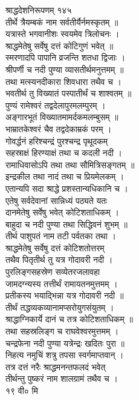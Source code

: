 \documentclass[11pt, openany]{book}
\begin{document}
{{{{{{{{{{{{{{{{{{{{{{{{{{{{{{{{{{{{{{{{{{{{{{{{{{{{{{{{{{{{{{{{{{{{{{{{{{{{{{{{{ }{ श्राद्धदेशनिरूपणम् १४५}{\\
तीर्थे त्रैयम्बकं नाम सर्वतीर्यैर्नमस्कृतम् ॥\\
यत्रास्ते भगवानीशः स्वयमेव त्रिलोचनः ।\\
श्राद्धमेतेषु सर्वेषु दत्तं कोटिगुणं भवेत् ॥\\
स्मरणादपि पापानि व्रजन्ति शतधा द्विजाः ।\\
श्रीपर्णी च नदी पुण्या व्यासतीर्थमनुत्तमम् ॥\\
तथा मत्स्यनदीकारा शिवधारा तथैव च ।\\
भवतीर्थ तु विख्यातं पस्पातीर्थं च शाश्वतम् ॥\\
पुण्यं रामेश्वरं तद्वदेलापुरमलम्पुरम् ।\\
अङ्गारभूतं विख्यातमामर्दकमलम्बुसम् ॥\\
भाम्रातकेश्वरं चैव तद्वदेकाम्रकं परम् ।\\
गोवर्द्धनं हरिश्चन्द्रं पुरश्चन्द्र पृथूदकम् \textbar{}\textbar{}\\
सहस्राक्षं हिरण्याक्षं तथा च कदली नदी ।\\
रामाधिवासोऽपि तथा तथा सौमित्रिसङ्गतम् ॥\\
इन्द्रकील तथा नादं तथा च प्रियमेलकम् ।\\
एतान्यपि सदा श्राद्धे प्रशस्तान्यधिकानि च ।\\
एतेषु सर्वदेवानां सान्निध्यं पठ्यते यतः \textbar{}\textbar{}\\
दानमेतेषु सर्वेषु भवेत् कोटिशताधिकम् ।\\
बाहुदा च नदी पुण्या तथा सिद्धिवनं शुभम् ॥\\
तीर्थ पाशुपतं नाम तटी पर्वतका तथा ।\\
श्राद्धमेतेषु सर्वेषु दत्तं कोटिशतोत्तरम् \textbar{}\textbar{}\\
तथैव पितृतीर्थ तु यत्र गोदावरी नदी ।\\
पुरलिङ्गसहस्रेण सव्येतरजलावहा \textbar{}\textbar{}\\
जामदग्न्यस्य तत्तीर्थं रामायतनमुत्तमम् ।\\
प्रतीकस्य भयाद्भिन्ना यत्र गोदावरी नदी ॥\\
तीर्थं तद्धव्यकव्यानामप्सरोयुगसंयुतम् ।\\
श्राद्धाग्निकार्ये दानं च तत्र कोटिशताधिकम् ॥\\
तथा सहस्रलिङ्ग च राघवेश्वरमुत्तमम् ।\\
चन्द्रफेना नदी पुण्या यत्रेन्द्रः खदितः पुरा ॥\\
निहत्य नमुचिं शत्रु तपसा स्वर्गमाप्तवान् ।\\
तत्र दत्तं नरैः श्राद्धमनन्तफलदं भवेत् \textbar{}\textbar{}\\
तीर्थन्तु पुष्करं नाम शालग्रामं तथैव च ।\\
१९ वी० मि\\


}}}}}}}}}}}}}}}}}}}}}}}}}}}}}}}}}}}}}}}}}}}}}}}}}}}}}}}}}}}}}}}}}}}}}}}}}}}}}}}}}
\end{document}

